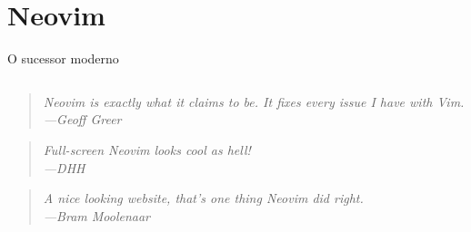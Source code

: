 \section{Neovim}
\begin{frame}{O sucessor moderno}
    \begin{columns}
        \begin{column}{0.6\textwidth}
            \begin{widedescription}
              \item \begin{quotation} \small\it
                Neovim is exactly what it claims to be. It fixes every issue I have with Vim.\\
                \hspace{1em plus 1fill}---Geoff Greer
              \end{quotation}

              \item \begin{quotation} \small\it
                Full-screen Neovim looks cool as hell!\\
                \hspace{1em plus 1fill}---DHH
              \end{quotation}

              \item \begin{quotation} \small\it
                A nice looking website, that's one thing Neovim did right.\\
                \hspace{1em plus 1fill}---Bram Moolenaar
              \end{quotation}

            \end{widedescription}
        \end{column}


\end{columns}
\end{frame}
